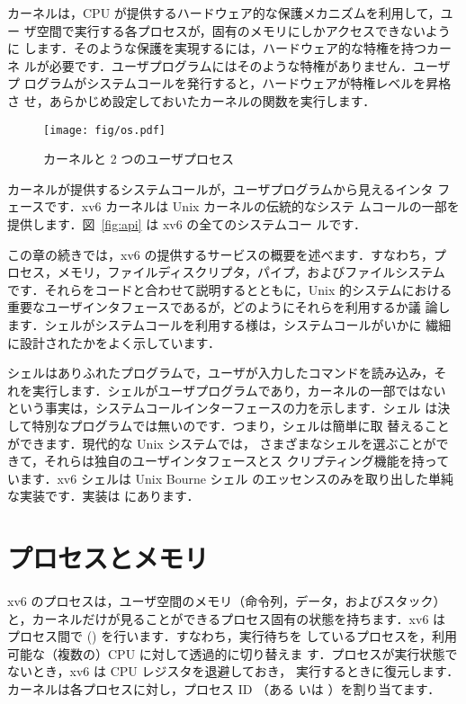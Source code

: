 カーネルは，CPU が提供するハードウェア的な保護メカニズムを利用して，ユー
ザ空間で実行する各プロセスが，固有のメモリにしかアクセスできないように
します．そのような保護を実現するには，ハードウェア的な特権を持つカーネ
ルが必要です．ユーザプログラムにはそのような特権がありません．ユーザプ
ログラムがシステムコールを発行すると，ハードウェアが特権レベルを昇格さ
せ，あらかじめ設定しておいたカーネルの関数を実行します．


\begin{figure}[t]
\center
\texttt{[image: fig/os.pdf]}
\caption{カーネルと 2 つのユーザプロセス}
\label{fig:os}
\end{figure}


カーネルが提供するシステムコールが，ユーザプログラムから見えるインタ
フェースです．xv6 カーネルは Unix カーネルの伝統的なシステ
ムコールの一部を提供します．図~\ref{fig:api} は xv6 の全てのシステムコー
ルです．

この章の続きでは，xv6 の提供するサービスの概要を述べます．すなわち，プ
ロセス，メモリ，ファイルディスクリプタ，パイプ，およびファイルシステム
です．それらをコードと合わせて説明するとともに，Unix 的システムにおける
重要なユーザインタフェースであるが，どのようにそれらを利用するか議
論します．シェルがシステムコールを利用する様は，システムコールがいかに
繊細に設計されたかをよく示しています．


シェルはありふれたプログラムで，ユーザが入力したコマンドを読み込み，そ
れを実行します．シェルがユーザプログラムであり，カーネルの一部ではない
という事実は，システムコールインターフェースの力を示します．シェル
は決して特別なプログラムでは無いのです．つまり，シェルは簡単に取
替えることができます．現代的な Unix システムでは，
さまざまなシェルを選ぶことができて，それらは独自のユーザインタフェースとス
クリプティング機能を持っています．xv6 シェルは Unix Bourne シェル
のエッセンスのみを取り出した単純な実装です．実装は
 にあります．

\section{プロセスとメモリ}

xv6 のプロセスは，ユーザ空間のメモリ（命令列，データ，およびスタック）
と，カーネルだけが見ることができるプロセス固有の状態を持ちます．xv6 は
プロセス間で () を行います．すなわち，実行待ちを
しているプロセスを，利用可能な（複数の）CPU に対して透過的に切り替えま
す．プロセスが実行状態でないとき，xv6 は CPU レジスタを退避しておき，
実行するときに復元します．カーネルは各プロセスに対し，プロセス ID （ある
いは ）を割り当てます．


